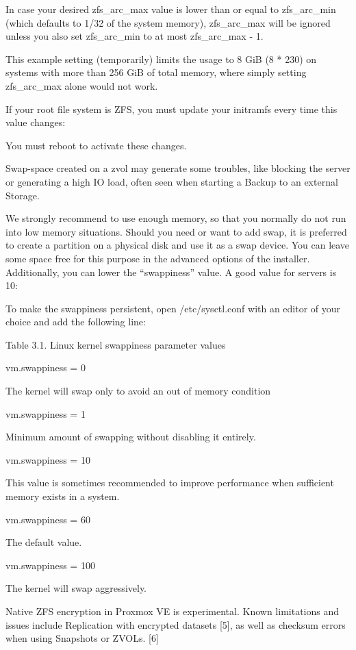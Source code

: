 In case your desired zfs_arc_max value is lower than or equal to zfs_arc_min (which defaults to 1/32 of the system memory), zfs_arc_max will be ignored unless you also set zfs_arc_min to at most zfs_arc_max - 1.

This example setting (temporarily) limits the usage to 8 GiB (8 * 230) on systems with more than 256 GiB of total memory, where simply setting zfs_arc_max alone would not work.

If your root file system is ZFS, you must update your initramfs every time this value changes:

You must reboot to activate these changes.

Swap-space created on a zvol may generate some troubles, like blocking the server or generating a high IO load, often seen when starting a Backup to an external Storage.

We strongly recommend to use enough memory, so that you normally do not run into low memory situations. Should you need or want to add swap, it is preferred to create a partition on a physical disk and use it as a swap device. You can leave some space free for this purpose in the advanced options of the installer. Additionally, you can lower the “swappiness” value. A good value for servers is 10:

To make the swappiness persistent, open /etc/sysctl.conf with an editor of your choice and add the following line:

Table 3.1. Linux kernel swappiness parameter values

vm.swappiness = 0

The kernel will swap only to avoid an out of memory condition

vm.swappiness = 1

Minimum amount of swapping without disabling it entirely.

vm.swappiness = 10

This value is sometimes recommended to improve performance when sufficient memory exists in a system.

vm.swappiness = 60

The default value.

vm.swappiness = 100

The kernel will swap aggressively.

Native ZFS encryption in Proxmox VE is experimental. Known limitations and issues include Replication with encrypted datasets [5], as well as checksum errors when using Snapshots or ZVOLs. [6]

